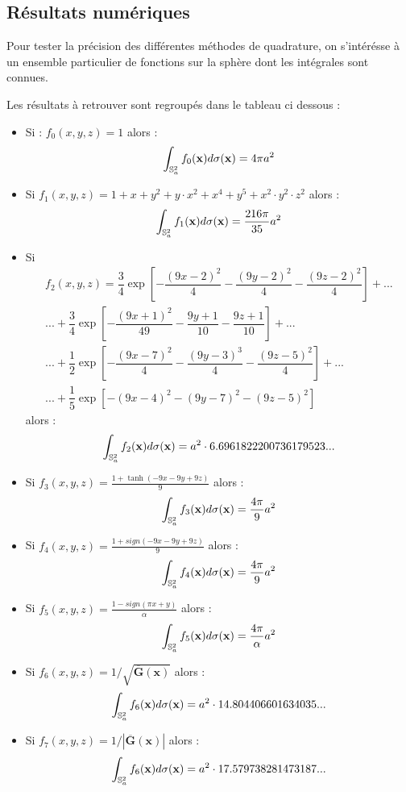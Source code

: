 \subsection{Résultats numériques} %

Pour tester la précision des différentes méthodes de quadrature, on s'intérésse à un ensemble particulier de fonctions sur la sphère dont les intégrales sont connues.

Les résultats à retrouver sont regroupés dans le tableau ci dessous :


\begin{itemize}
\item Si : $f_0(x,y,z)=1$ alors :
$$
\displaystyle\int_{\mathbb{S}_a^2} f_0(\mathbf{x}) d\sigma (\mathbf{x})=4 \pi a^2
$$
\item Si $f_1(x,y,z)=1+x+y^2+y\cdot x^2+x^4+y^5+x^2 \cdot y^2 \cdot z^2$ alors :
$$
\displaystyle\int_{\mathbb{S}_a^2} f_1(\mathbf{x}) d\sigma (\mathbf{x})=\dfrac{216 \pi}{35} a^2
$$
\item Si 
\begin{multline}
f_2(x,y,z) = \dfrac{3}{4} \exp \left[ - \dfrac{(9x-2)^2}{4} - \dfrac{(9y-2)^2}{4} - \dfrac{(9z-2)^2}{4} \right] + ...\\
... + \dfrac{3}{4} \exp \left[ - \dfrac{(9x+1)^2}{49} - \dfrac{9y+1}{10} - \dfrac{9z+1}{10} \right] + ...\\
... + \dfrac{1}{2} \exp \left[ - \dfrac{(9x-7)^2}{4} - \dfrac{(9y-3)^3}{4} - \dfrac{(9z-5)^2}{4} \right] + ...\\
... + \dfrac{1}{5} \exp \left[ - (9x-4)^2 - (9y-7)^2 - (9z-5)^2 \right]
\end{multline}
alors :
$$
\displaystyle\int_{\mathbb{S}_a^2} f_2(\mathbf{x}) d\sigma (\mathbf{x})=a^2 \cdot 6.6961822200736179523...
$$
\item Si $f_3(x,y,z)=\frac{1+\tanh(-9x-9y+9z)}{9}$ alors :
$$
\displaystyle\int_{\mathbb{S}_a^2} f_3(\mathbf{x}) d\sigma (\mathbf{x})=\frac{4\pi}{9} a^2
$$
\item Si $f_4(x,y,z)=\frac{1+sign(-9x-9y+9z)}{9}$ alors :
$$
\displaystyle\int_{\mathbb{S}_a^2} f_4(\mathbf{x}) d\sigma (\mathbf{x})=\frac{4\pi}{9} a^2
$$
\item Si $f_5(x,y,z)=\frac{1-sign(\pi x + y)}{\alpha}$ alors :
$$
\displaystyle\int_{\mathbb{S}_a^2} f_5(\mathbf{x}) d\sigma (\mathbf{x})=\frac{4\pi}{\alpha} a^2
$$
\item Si $f_6(x,y,z)=1/\sqrt{\overline{\mathbf{G}}(\mathbf{x})}$ alors :
$$
\displaystyle\int_{\mathbb{S}_a^2} f_6(\mathbf{x}) d\sigma (\mathbf{x})=a^2 \cdot 14.804406601634035...
$$
\item Si $f_7(x,y,z)=1/|\overline{\mathbf{G}}(\mathbf{x})|$ alors :
$$
\displaystyle\int_{\mathbb{S}_a^2} f_6(\mathbf{x}) d\sigma (\mathbf{x})=a^2 \cdot 17.579738281473187...
$$
\end{itemize}


